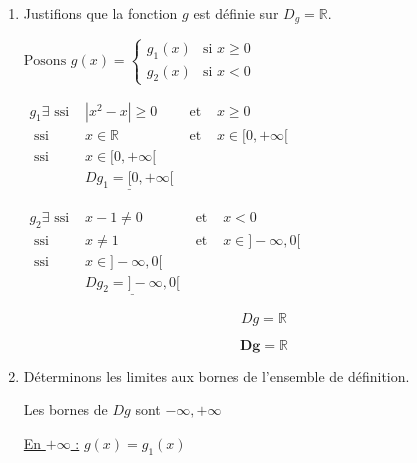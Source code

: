 \documentclass[12pt,a4paper]{article}
\begin{document}
\begin{enumerate}
    \item Justifions que la fonction \( g \) est définie sur \( D_g = \mathbb{R} \).
    
                     \( \text{Posons }g(x) = \left\{
                    \begin{array}{ll}
                        g_{1}(x) & \text{si } x \geq 0    \\
                        g_{2}(x)         & \text{si } x < 0
                    \end{array}
                    \right. \)
                    
                    \(
                    \begin{aligned}
                    	 g_{1} \exists \text{ ssi }&  |x^2 - x| \geq 0  &\text{ et }&  x \geq 0 \\
                    								  \text{ ssi }&			x\in \mathbb{R}  &\text{ et }&  x\in[0,+\infty[ \\
                    								  \text{ ssi }&			 x\in[0,+\infty[\\
                    								  						&      \underline{Dg_{1} = [0,+\infty[}
                    \end{aligned}
										\)
										
										\(
									\begin{aligned}
											g_{2} \exists \text{ ssi }&  x - 1 \neq 0  &\text{ et }&  x < 0 \\
																		\text{ ssi }& x  \neq 1  &\text{ et }&  x\in]-\infty,0[ \\
																		\text{ ssi }&	x\in]-\infty,0[\\
																		&\underline{ Dg_{2} = ]-\infty,0[ }
									\end{aligned}
									\)

\[ Dg= \mathbb{R} \]									
									
									  \begin{resultbox}
                        \[
                            \mathbf{Dg= \mathbb{R} }
                        \]
                    \end{resultbox}	
    \item Déterminons les limites aux bornes de l'ensemble de définition.

		Les bornes de $Dg$ sont $-\infty,+\infty$ 
		
		\underline{En $+\infty$ :} $g(x) = g_{1}(x)$


\end{enumerate}
\end{document}
